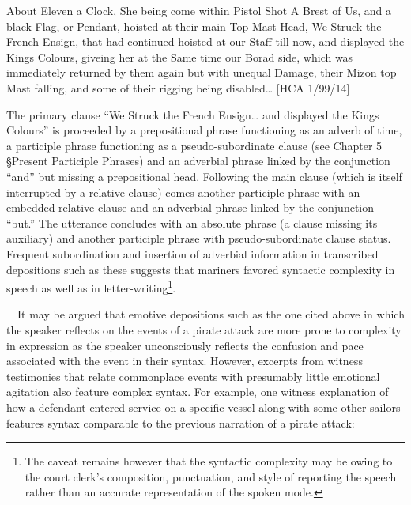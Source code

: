 \begin{styleStandard}
About Eleven a Clock, She being come within Pistol Shot A Brest of Us, and a black Flag, or Pendant, hoisted at their main Top Mast Head, We Struck the French Ensign, that had continued hoisted at our Staff till now, and displayed the Kings Colours, giveing her at the Same time our Borad side, which was immediately returned by them again but with unequal Damage, their Mizon top Mast falling, and some of their rigging being disabled… [HCA 1/99/14] 
\end{styleStandard}

\begin{styleStandard}
The primary clause “We Struck the French Ensign… and displayed the Kings Colours” is proceeded by a prepositional phrase functioning as an adverb of time, a participle phrase functioning as a pseudo-subordinate clause (see Chapter 5 §Present Participle Phrases) and an adverbial phrase linked by the conjunction “and” but missing a prepositional head. Following the main clause (which is itself interrupted by a relative clause) comes another participle phrase with an embedded relative clause and an adverbial phrase linked by the conjunction “but.” The utterance concludes with an absolute phrase (a clause missing its auxiliary) and another participle phrase with pseudo-subordinate clause status. Frequent subordination and insertion of adverbial information in transcribed depositions such as these suggests that mariners favored syntactic complexity in speech as well as in letter-writing\footnote{ The caveat remains however that the syntactic complexity may be owing to the court clerk’s composition, punctuation, and style of reporting the speech rather than an accurate representation of the spoken mode. }. 
\end{styleStandard}

\begin{styleStandard}
\ \ It may be argued that emotive depositions such as the one cited above in which the speaker reflects on the events of a pirate attack are more prone to complexity in expression as the speaker unconsciously reflects the confusion and pace associated with the event in their syntax. However, excerpts from witness testimonies that relate commonplace events with presumably little emotional agitation also feature complex syntax. For example, one witness explanation of how a defendant entered service on a specific vessel along with some other sailors features syntax comparable to the previous narration of a pirate attack:
\end{styleStandard}

